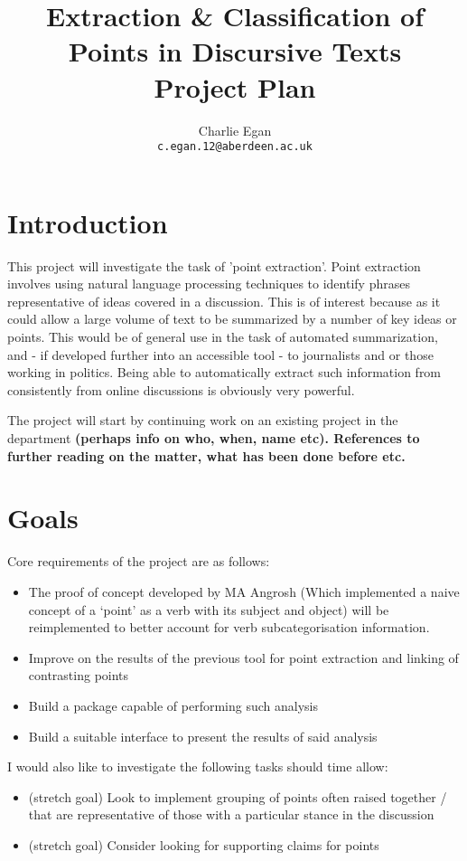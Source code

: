 \documentclass[tikz]{article}
\begin{document}
  \title{Extraction \& Classification of Points in Discursive Texts\\ Project Plan}
  \author{Charlie Egan \\ \texttt{c.egan.12@aberdeen.ac.uk}}

  \maketitle

  \section{Introduction}
    This project will investigate the task of 'point extraction'. Point extraction involves using natural language processing techniques to identify phrases representative of ideas covered in a discussion. This is of interest because as it could allow a large volume of text to be summarized by a number of key ideas or points. This would be of general use in the task of automated summarization, and - if developed further into an accessible tool - to journalists and or those working in politics. Being able to automatically extract such information from consistently from online discussions is obviously very powerful.

    The project will start by continuing work on an existing project in the department \textbf{(perhaps info on who, when, name etc). References to further reading on the matter, what has been done before etc.}

  \section{Goals}
    Core requirements of the project are as follows:
    \begin{itemize}
      \item{The proof of concept developed by MA Angrosh (Which implemented a naive concept of a `point' as a verb with its subject and object) will be reimplemented to better account for verb subcategorisation information.}
      \item{Improve on the results of the previous tool for point extraction and linking of contrasting points}
      \item{Build a package capable of performing such analysis}
      \item{Build a suitable interface to present the results of said analysis}
    \end{itemize}
    I would also like to investigate the following tasks should time allow:
    \begin{itemize}
      \item{(stretch goal) Look to implement grouping of points often raised together / that are representative of those with a particular stance in the discussion}
      \item{(stretch goal) Consider looking for supporting claims for points}
    \end{itemize}
\end{document}

